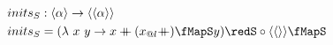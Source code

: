 \documentclass[preview]{standalone}
\begin{document}
\begin{align*}
  inits_S &: \vect{\alpha} \rightarrow \vect{\vect{\alpha}} \\
  inits_S & = (\lambda\ x\ y \rightarrow x \fcat (x_{@l} \fcat) \fMapS y) \redS \circ \vect{\vect{}} \fMapS
\end{align*}
\end{document}
